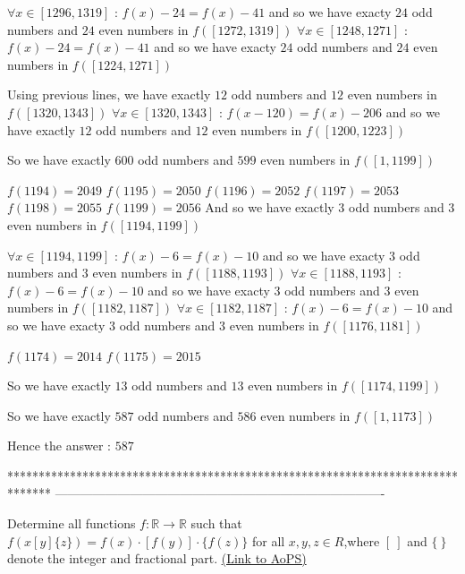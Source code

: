 \begin{solution}
$\forall x\in[1296,1319]$ : $f(x)-24=f(x)-41$ and so we have exacty $24$ odd numbers and $24$ even numbers in $f([1272,1319])$
$\forall x\in[1248,1271]$ : $f(x)-24=f(x)-41$ and so we have exacty $24$ odd numbers and $24$ even numbers in $f([1224,1271])$

Using previous lines, we have exactly $12$ odd numbers and $12$ even numbers in $f([1320,1343])$
$\forall x\in [1320,1343]$ : $f(x-120)=f(x)-206$ and so we have exactly $12$ odd numbers and $12$ even numbers in $f([1200,1223])$

So we have exactly $600$ odd numbers and $599$ even numbers in $f([1,1199])$

$f(1194)=2049$
$f(1195)=2050$
$f(1196)=2052$
$f(1197)=2053$
$f(1198)=2055$
$f(1199)=2056$
And so we have exactly $3$ odd numbers and $3$ even numbers in $f([1194,1199])$

$\forall x\in[1194,1199]$ : $f(x)-6=f(x)-10$ and so we have exacty $3$ odd numbers and $3$ even numbers in $f([1188,1193])$
$\forall x\in[1188,1193]$ : $f(x)-6=f(x)-10$ and so we have exacty $3$ odd numbers and $3$ even numbers in $f([1182,1187])$
$\forall x\in[1182,1187]$ : $f(x)-6=f(x)-10$ and so we have exacty $3$ odd numbers and $3$ even numbers in $f([1176,1181])$

$f(1174)=2014$
$f(1175)=2015$

So we have exactly $13$ odd numbers and $13$ even numbers in $f([1174,1199])$

So we have exactly $587$ odd numbers and $586$ even numbers in $f([1,1173])$


Hence the answer : $\boxed{587}$
\end{solution}
*******************************************************************************
-------------------------------------------------------------------------------

\begin{problem}
	Determine all functions $f: \mathbb{R}\to\mathbb{R}$ such that $f(x[y]\{z\})=f(x){\cdot}[f(y)]{\cdot}\{f(z)\}$ for all $x,y,z{\in}R$,where $[\ ]$ and $\{\ \}$ denote the integer and fractional part.
	\flushright \href{https://artofproblemsolving.com/community/c6h548203}{(Link to AoPS)}
\end{problem}



